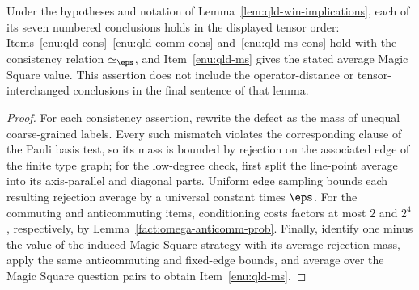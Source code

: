 \begin{lemma}
	\label{lem:qld-win-implications-exact}
	\leanok
	Under the hypotheses and notation of
	Lemma~\ref{lem:qld-win-implications}, each of its seven numbered conclusions
	holds in the displayed tensor order: Items~\ref{enu:qld-cons}--\ref{enu:qld-comm-cons}
	and~\ref{enu:qld-ms-cons} hold with the consistency relation
	$\simeq_\eps$, and Item~\ref{enu:qld-ms} gives the stated average Magic
	Square value. This assertion does not include the operator-distance or
	tensor-interchanged conclusions in the final sentence of that lemma.
\end{lemma}
\begin{proof}
	\leanok
	For each consistency assertion, rewrite the defect as the mass of unequal
	coarse-grained labels. Every such mismatch violates the corresponding clause
	of the Pauli basis test, so its mass is bounded by rejection on the associated
	edge of the finite type graph; for the low-degree check, first split the
	line-point average into its axis-parallel and diagonal parts. Uniform edge
	sampling bounds each resulting rejection average by a universal constant
	times $\eps$. For the commuting and anticommuting items, conditioning costs
	factors at most $2$ and $2^4$, respectively, by
	Lemma~\ref{fact:omega-anticomm-prob}. Finally, identify one minus the value of
	the induced Magic Square strategy with its average rejection mass, apply the
	same anticommuting and fixed-edge bounds, and average over the Magic Square
	question pairs to obtain Item~\ref{enu:qld-ms}.
\end{proof}

